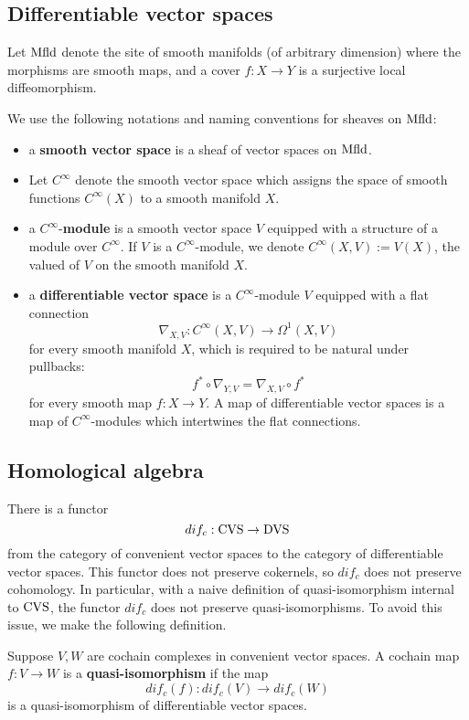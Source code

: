 \documentclass[10pt, oneside]{article}
\begin{document}
\subsection{Differentiable vector spaces}
\def\Mfld{{\rm Mfld}}

Let $\Mfld$ denote the site of smooth manifolds (of arbitrary dimension) where the morphisms are smooth maps, and a cover $f : X \to Y$ is a surjective local diffeomorphism.  

\begin{dfn} 
We use the following notations and naming conventions for sheaves on $\Mfld$:
\begin{itemize}
\item a {\bf smooth vector space} is a sheaf of vector spaces on $\Mfld$.
\item Let $C^\infty$ denote the smooth vector space which assigns the space of smooth functions $C^\infty(X)$ to a smooth manifold $X$.
\item a $C^\infty$-{\bf module} is a smooth vector space $V$ equipped with a structure of a module over $C^\infty$. 
If $V$ is a $C^\infty$-module, we denote $C^\infty(X, V) := V(X)$, the valued of $V$ on the smooth manifold $X$.
\item a {\bf differentiable vector space} is a $C^\infty$-module $V$ equipped with a flat connection
\[
\nabla_{X,V} : C^\infty(X, V) \to \Omega^1(X, V)
\]
for every smooth manifold $X$, which is required to be natural under pullbacks:
\[
f^* \circ \nabla_{Y,V} = \nabla_{X,V} \circ f^*
\]
for every smooth map $f : X \to Y$. 
A map of differentiable vector spaces is a map of $C^\infty$-modules which intertwines the flat connections. 
\end{itemize}
\end{dfn}

\subsection{Homological algebra}

There is a functor
\[
dif_c : {\rm CVS} \to {\rm DVS} 
\]
from the category of convenient vector spaces to the category of differentiable vector spaces. 
This functor does not preserve cokernels, so $dif_c$ does not preserve cohomology. 
In particular, with a naive definition of quasi-isomorphism internal to ${\rm CVS}$, the functor $dif_c$ does not preserve quasi-isomorphisms. 
To avoid this issue, we make the following definition. 

\begin{dfn}
Suppose $V,W$ are cochain complexes in convenient vector spaces. 
A cochain map $f : V \to W$ is a {\bf quasi-isomorphism} if the map
\[
dif_c (f) : dif_c(V) \to dif_c(W)
\]
is a quasi-isomorphism of differentiable vector spaces.
\end{dfn}
\end{document}
